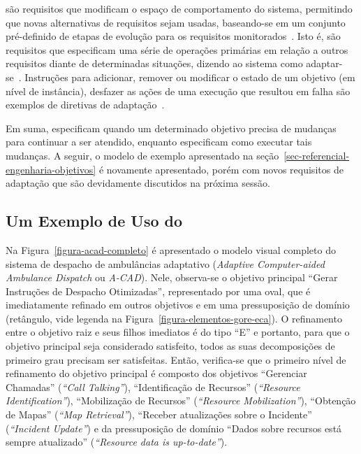 \evoreqs são requisitos que modificam o espaço de comportamento do sistema, permitindo que novas alternativas de requisitos sejam usadas, baseando-se em um conjunto pré-definido de etapas de evolução para os requisitos monitorados~\cite{souza2012requirement}. Isto é, \evoreqs são requisitos que especificam uma série de operações primárias em relação a outros requisitos diante de determinadas situações, dizendo ao sistema como adaptar-se~\cite{souza2012requirement}. Instruções para adicionar, remover ou modificar o estado de um objetivo (em nível de instância), desfazer as ações de uma execução que resultou em falha são exemplos de diretivas de adaptação~\cite{souza2013requirements}.

Em suma, \awreqs especificam quando um determinado objetivo precisa de mudanças para continuar a ser atendido, enquanto \evoreqs especificam como executar tais mudanças. A seguir, o modelo de exemplo apresentado na seção~\ref{sec-referencial-engenharia-objetivos} é novamente apresentado, porém com novos requisitos de adaptação que são devidamente discutidos na próxima sessão.

\subsection{Um Exemplo de Uso do \zanshin}
\label{sec-referencial-engenharia-objetivos-exemplo}

Na Figura~\ref{figura-acad-completo} é apresentado o modelo visual completo do sistema de despacho de ambulâncias adaptativo (\textit{Adaptive Computer-aided Ambulance Dispatch} ou \textit{A-CAD}). Nele, observa-se o objetivo principal ``Gerar Instruções de Despacho Otimizadas'', representado por uma oval, que é imediatamente refinado em outros objetivos e em uma pressuposição de domínio (retângulo, vide legenda na Figura~\ref{figura-elementos-gore-eca}). O refinamento entre o objetivo raiz e seus filhos imediatos é do tipo ``E'' e portanto, para que o objetivo principal seja considerado satisfeito, todos as suas decomposições de primeiro grau precisam ser satisfeitas. Então, verifica-se que o primeiro nível de refinamento do objetivo principal é composto dos objetivos ``Gerenciar Chamadas'' (\textit{``Call Talking''}), ``Identificação de Recursos'' (\textit{``Resource Identification''}), ``Mobilização de Recursos'' (\textit{``Resource Mobilization''}), ``Obtenção de Mapas'' (\textit{``Map Retrieval''}), ``Receber atualizações sobre o Incidente'' (\textit{``Incident Update''}) e da pressuposição de domínio ``Dados sobre recursos está sempre atualizado'' (\textit{``Resource data is up-to-date''}).


